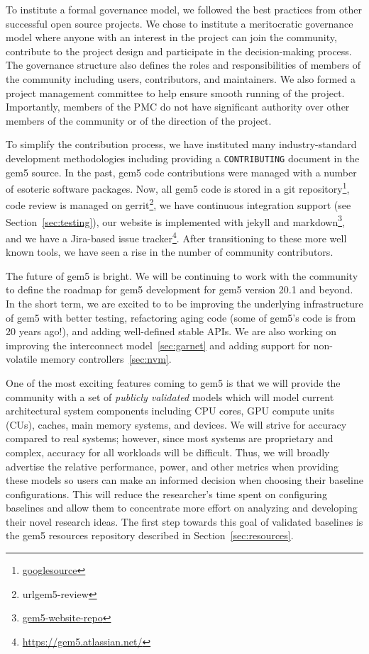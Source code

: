 To institute a formal governance model, we followed the best practices from other successful open source projects.
We chose to institute a meritocratic governance model where anyone with an interest in the project can join the community, contribute to the project design and participate in the decision-making process.
The governance structure also defines the roles and responsibilities of members of the community including users, contributors, and maintainers.
We also formed a project management committee to help ensure smooth running of the project.
Importantly, members of the PMC do not have significant authority over other members of the community or of the direction of the project.

To simplify the contribution process, we have instituted many industry-standard development methodologies including providing a \verb|CONTRIBUTING| document in the gem5 source.
In the past, gem5 code contributions were managed with a number of esoteric software packages.
Now, all gem5 code is stored in a git repository\footnote{\url{googlesource}}, code review is managed on gerrit\footnote{url{gem5-review}}, we have continuous integration support (see Section~\ref{sec:testing}), our website is implemented with jekyll and markdown\footnote{\url{gem5-website-repo}}, and we have a Jira-based issue tracker\footnote{\url{https://gem5.atlassian.net/}}.
After transitioning to these more well known tools, we have seen a rise in the number of community contributors.

The future of gem5 is bright.
We will be continuing to work with the community to define the roadmap for gem5 development for gem5 version 20.1 and beyond.
In the short term, we are excited to to be improving the underlying infrastructure of gem5 with better testing, refactoring aging code (some of gem5's code is from 20 years ago!), and adding well-defined stable APIs.
We are also working on improving the interconnect model~\ref{sec:garnet} and adding support for non-volatile memory controllers~\ref{sec:nvm}.

One of the most exciting features coming to gem5 is that we will provide the community with a set of \emph{publicly validated} models which will model current architectural system components including CPU cores, GPU compute units (CUs), caches, main memory systems, and devices.
We will strive for accuracy compared to real systems; however, since most systems are proprietary and complex, accuracy for all workloads will be difficult.
Thus, we will broadly advertise the relative performance, power, and other metrics when providing these models so users can make an informed decision when choosing their baseline configurations.
This will reduce the researcher's time spent on configuring baselines and allow them to concentrate more effort on analyzing and developing their novel research ideas.
The first step towards this goal of validated baselines is the gem5 resources repository described in Section~\ref{sec:resources}.


